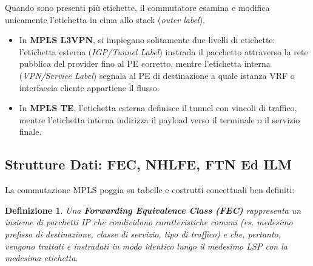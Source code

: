 \documentclass[11pt, a4paper]{article}
\newtheorem{theorem}{Definizione}
\begin{document}
Quando sono presenti più etichette, il commutatore esamina e modifica unicamente l'etichetta in cima allo stack (\emph{outer label}).
\begin{itemize}[noitemsep]
    \item In \textbf{MPLS L3VPN}, si impiegano solitamente due livelli di etichette: l'etichetta esterna (\emph{IGP/Tunnel Label}) instrada il pacchetto attraverso la rete pubblica del provider fino al PE corretto, mentre l'etichetta interna (\emph{VPN/Service Label}) segnala al PE di destinazione a quale istanza VRF o interfaccia cliente appartiene il flusso.
    \item In \textbf{MPLS TE}, l'etichetta esterna definisce il tunnel con vincoli di traffico, mentre l'etichetta interna indirizza il payload verso il terminale o il servizio finale.
\end{itemize}


\subsection{Strutture Dati: FEC, NHLFE, FTN Ed ILM}
La commutazione MPLS poggia su tabelle e costrutti concettuali ben definiti:

\begin{theorem}
Una \textbf{Forwarding Equivalence Class (FEC)} rappresenta un insieme di pacchetti IP che condividono caratteristiche comuni (es. medesimo prefisso di destinazione, classe di servizio, tipo di traffico) e che, pertanto, vengono trattati e instradati in modo identico lungo il medesimo LSP con la medesima etichetta.
\end{theorem}
\end{document}
